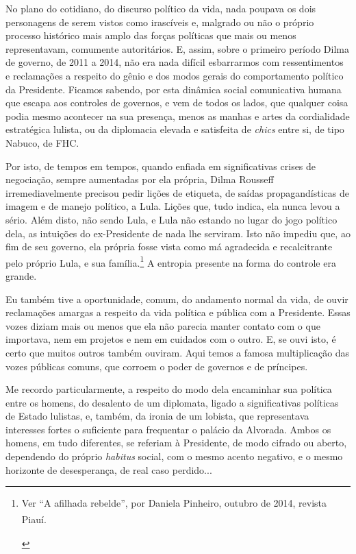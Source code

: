No plano do cotidiano, do discurso político da vida, nada poupava os
dois personagens de serem vistos como irascíveis e, malgrado ou não o
próprio processo histórico mais amplo das forças políticas que mais ou
menos representavam, comumente autoritários. E, assim, sobre o primeiro
período Dilma de governo, de 2011 a 2014, não era nada difícil
esbarrarmos com ressentimentos e reclamações a respeito do gênio e dos
modos gerais do comportamento político da Presidente. Ficamos sabendo,
por esta dinâmica social comunicativa humana que escapa aos controles de
governos, e vem de todos os lados, que qualquer coisa podia mesmo
acontecer na sua presença, menos as manhas e artes da cordialidade
estratégica lulista, ou da diplomacia elevada e satisfeita de
\emph{chics} entre si, de tipo Nabuco, de FHC.

Por isto, de tempos em tempos, quando enfiada em significativas crises
de negociação, sempre aumentadas por ela própria, Dilma Rousseff
irremediavelmente precisou pedir lições de etiqueta, de saídas
propagandísticas de imagem e de manejo político, a Lula. Lições que,
tudo indica, ela nunca levou a sério. Além disto, não sendo Lula, e Lula
não estando no lugar do jogo político dela, as intuições do
ex-Presidente de nada lhe serviram. Isto não impediu que, ao fim de seu
governo, ela própria fosse vista como má agradecida e recalcitrante pelo
próprio Lula, e sua família.\footnote{Ver ``A afilhada rebelde'', por
  Daniela Pinheiro, outubro de 2014, revista
  Piauí.\textsuperscript{\\\\}} A entropia presente na forma do controle
era grande.

Eu também tive a oportunidade, comum, do andamento normal da vida, de
ouvir reclamações amargas a respeito da vida política e pública com a
Presidente. Essas vozes diziam mais ou menos que ela não parecia manter
contato com o que importava, nem em projetos e nem em cuidados com o
outro. E, se ouvi isto, é certo que muitos outros também ouviram. Aqui
temos a famosa multiplicação das vozes públicas comuns, que corroem o
poder de governos e de príncipes.

Me recordo particularmente, a respeito do modo dela encaminhar sua
política entre os homens, do desalento de um diplomata, ligado a
significativas políticas de Estado lulistas, e, também, da ironia de um
lobista, que representava interesses fortes o suficiente para frequentar
o palácio da Alvorada. Ambos os homens, em tudo diferentes, se referiam
à Presidente, de modo cifrado ou aberto, dependendo do próprio
\emph{habitus} social, com o mesmo acento negativo, e o mesmo horizonte
de desesperança, de real caso perdido...

